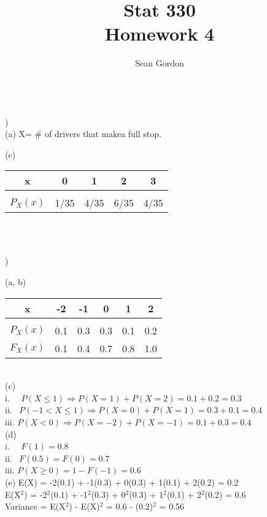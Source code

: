 \documentclass[12pt]{article}
\title{Stat 330\\Homework 4}
\author{Sean Gordon}
\begin{document}
\maketitle


\noindent\hrulefill \\


)\\
\indent (a) X= \# of drivers that makea full stop.\\
\indent \indent 


\indent (c)
\begin{tabular}{c|cccc}
 x & 0 & 1 & 2 & 3 \\
 \hline &&&&\\[-1em]
$P_X(x)$ & 1/35 & 4/35 & 6/35 & 4/35\\
\end{tabular}\\


\noindent \hrulefill \\
\pagebreak


)

\indent (a, b) 
\begin{tabular}{c|ccccc}
 x & -2 & -1 & 0 & 1 & 2 \\
 \hline &&&&&\\[-1em]
$P_X(x)$ & 0.1 & 0.3 & 0.3 & 0.1 & 0.2\\
$F_X(x)$ & 0.1 & 0.4 & 0.7 & 0.8 & 1.0\\
\end{tabular}\\


\indent (c) \\
\indent \indent i. \ \ $P(X\le 1) \Rightarrow P(X = 1) + P(X = 2) = 0.1+0.2 = 0.3$\\[.4em]
\indent \indent ii. \ $P(-1 < X \le 1) \Rightarrow P(X=0)+P(X=1) = 0.3+0.1 = 0.4$\\[.4em]
\indent \indent iii. $P(X < 0) \Rightarrow P(X=-2)+P(X=-1) = 0.1+0.3 = 0.4$\\

\indent (d) \\
\indent \indent i. \ \ $F(1) = 0.8$\\[.4em]
\indent \indent ii. \ $F(0.5) = F(0) = 0.7$\\[.4em]
\indent \indent iii. $P(X \ge 0) = 1-F(-1) = 0.6$\\

\indent (e) E(X) = -2(0.1) + -1(0.3) + 0(0.3) + 1(0.1) + 2(0.2) = 0.2\\[.4em]
\indent \indent E(X$^2$) = -2$^2$(0.1) + -1$^2$(0.3) + 0$^2$(0.3) + 1$^2$(0.1) + 2$^2$(0.2) = 0.6\\[.4em]
\indent \indent Variance = E(X$^2$) - E(X)$^2$ = 0.6 - (0.2)$^2$ = 0.56\\
\end{document}
